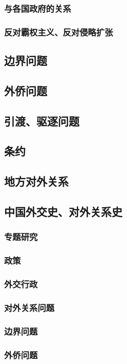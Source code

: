 \documentclass[UTF8]{../RepresentationUniverse}
\begin{document}
        \subsubsection{与各国政府的关系}
        \subsubsection{反对霸权主义、反对侵略扩张}
    \subsection{边界问题}
    \subsection{外侨问题}
    \subsection{引渡、驱逐问题}
    \subsection{条约}
    \subsection{地方对外关系}
    \subsection{中国外交史、对外关系史}
        \subsubsection{专题研究}
        \subsubsection{政策}
        \subsubsection{外交行政}
        \subsubsection{对外关系问题}
        \subsubsection{边界问题}
        \subsubsection{外侨问题}
\end{document}
